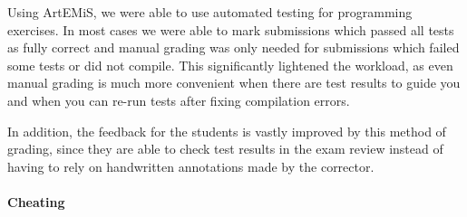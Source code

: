 Using ArtEMiS, we were able to use automated testing for programming exercises. In most cases we were able to mark submissions which passed all tests as fully correct and manual grading was only needed for submissions which failed some tests or did not compile. This significantly lightened the workload, as even manual grading is much more convenient when there are test results to guide you and when you can re-run tests after fixing compilation errors.

In addition, the feedback for the students is vastly improved by this method of grading, since they are able to check test results in the exam review instead of having to rely on handwritten annotations made by the corrector.


\paragraph{Cheating}

